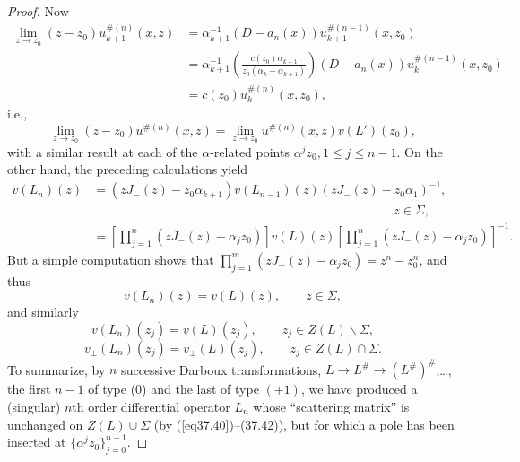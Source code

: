 \documentclass{surv-l}
\theoremstyle{plain}
\theoremstyle{definition}
\numberwithin{equation}{chapter}
\begin{document}
\begin{proof}
Now
\begin{align}\label{eq37.37}
\lim_{z\rightarrow z_{0}}(z-z_{0})u_{k+1}^{\#(n)}(x, z)& =\alpha_{k+1}^{-1}(D-a_{n}(x))u_{k+1}^{\#(n-1)}(x, z_{0})\\
& =\alpha_{k+1}^{-1}\left(\frac{c(z_{0})\alpha_{k+1}}{z_{0}(\alpha_{k}-\alpha_{k+1})}\right)(D-a_{n}(x))u_{k}^{\#(n-1)}(x, z_{0})\nonumber \\
& =c(z_{0})u_{k}^{\#(n)}(x, z_{0}), \nonumber
\end{align}
i.e.,
\begin{equation}\label{eq37.38}
\lim_{z\rightarrow z_{0}}(z-z_{0})u^{\#(n)}(x, z)=\lim_{z\rightarrow z_{0}}u^{\#(n)}(x, z)v(L')(z_{0}),
\end{equation}
with a similar result at each of the $\alpha$-related points $\alpha^{j}z_{0},1\leq j\leq n-1$. On the other hand, the preceding calculations yield
\begin{align}\label{eq37.39}
v(L_{n})(z)&=(zJ_{-}(z)-z_{0}\alpha_{k+1})v(L_{n-1})(z)(zJ_{-}(z)-z_{0}\alpha_{1})^{-1},\\
& \qquad \qquad \qquad \qquad \qquad \qquad \qquad \qquad \qquad \qquad \qquad \qquad z\in\Sigma,\nonumber \\
& =\left[\prod_{j=1}^{n}(zJ_{-}(z)-\alpha_{j}z_{0})\right]v(L)(z)\left[\prod_{j=1}^{n}(zJ_{-}(z)-\alpha_{j}z_{0})\right]^{-1}. \nonumber
\end{align}
But a simple computation shows that $\prod_{j=1}^{m}(zJ_{-}(z)-\alpha_{j}z_{0})=z^{n}-z_{0}^{n}$, and thus
\begin{equation}\label{eq37.40}
v(L_{n})(z)=v(L)(z), \qquad  z\in\Sigma,
\end{equation}
and similarly
\begin{equation}\label{eq37.41}
v(L_{n})(z_{j})=v(L)(z_{j}), \qquad  z_{j}\in Z(L)\backslash \Sigma,
\end{equation}
\begin{equation}\label{eq37.42}
v_{\pm}(L_{n})(z_{j})=v_{\pm}(L)(z_{j}), \qquad  z_{j}\in Z(L)\cap\Sigma.
\end{equation}
To summarize, by $n$ successive Darboux transformations, $L\rightarrow L^{\#}\rightarrow(L^{\#})^{\#}$,\ldots, the first $n-1$ of type (0) and the last of type $(+1)$, we have produced a (singular) $n$th order differential operator $L_{n}$ whose ``scattering matrix'' is unchanged on $ Z(L)\cup\Sigma$ (by (\ref{eq37.40})--(37.42)), but for which a pole has been inserted at $\{\alpha^{j}z_{0}\}_{j=0}^{n-1}$.


\end{proof}
\end{document}
